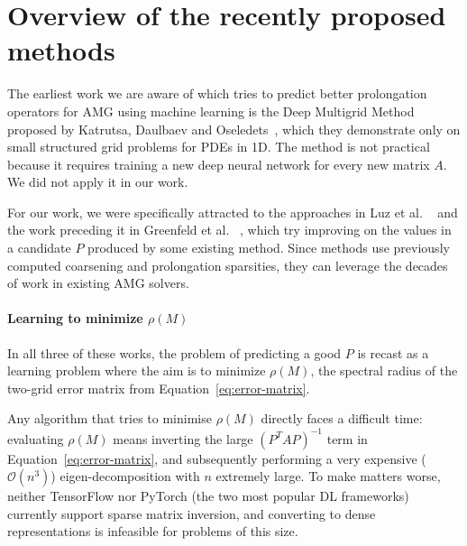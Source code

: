 \documentclass{svproc}
\newcommand{\etal}{et al. }
\begin{document}


\section{Overview of the recently proposed methods}
\label{sec:ml-methods}
The earliest work we are aware of which tries to predict better prolongation operators for AMG using machine learning is the Deep Multigrid Method proposed by Katrutsa, Daulbaev and Oseledets~\cite{Katrutsa2017}, which they demonstrate only on small structured grid problems for PDEs in 1D. The method is not practical because it requires training a new deep neural network for every new matrix $A$. We did not apply it in our work.

For our work, we were specifically attracted to the approaches in Luz \etal~\cite{Luz2020} and the work preceding it in Greenfeld \etal~\cite{Greenfeld2019}, which try improving on the values in a candidate $P$ produced by some existing method. Since methods use previously computed coarsening and prolongation sparsities, they can leverage the decades of work in existing AMG solvers.

\paragraph{Learning to minimize $\rho(M)$}
In all three of these works, the problem of predicting a good $P$ is recast as a learning problem where the aim is to minimize $\rho(M)$, the spectral radius of the two-grid error matrix from Equation~\ref{eq:error-matrix}. 

Any algorithm that tries to minimise $\rho(M)$ directly faces a difficult time: evaluating $\rho(M)$ means inverting the large $(P^TAP)^{-1}$ term in Equation~\ref{eq:error-matrix}, and subsequently performing a very expensive ($\mathcal{O}(n^3)$) eigen-decomposition with $n$ extremely large. To make matters worse, neither TensorFlow nor PyTorch (the two most popular DL frameworks) currently support sparse matrix inversion, and converting to dense representations is infeasible for problems of this size.
\end{document}
